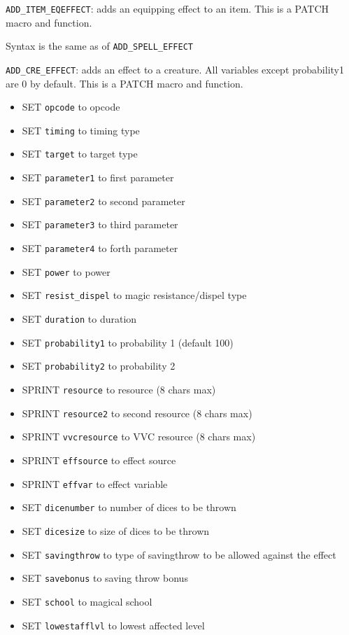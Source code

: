 \documentclass{article}
\begin{document}
\verb+ADD_ITEM_EQEFFECT+: adds an equipping effect to an item.
This is a PATCH macro and function.
\begin{list}{}{}
\item Syntax is the same as of \verb+ADD_SPELL_EFFECT+
\end{list}

\verb+ADD_CRE_EFFECT+: adds an effect to a creature. All variables except probability1 are 0 by default.
This is a PATCH macro and function.
\begin{itemize}
\item SET \verb+opcode+ to opcode
\item SET \verb+timing+ to timing type
\item SET \verb+target+ to target type
\item SET \verb+parameter1+ to first parameter
\item SET \verb+parameter2+ to second parameter
\item SET \verb+parameter3+ to third parameter
\item SET \verb+parameter4+ to forth parameter
\item SET \verb+power+ to power
\item SET \verb+resist_dispel+ to magic resistance/dispel type
\item SET \verb+duration+ to duration
\item SET \verb+probability1+ to probability 1 (default 100)
\item SET \verb+probability2+ to probability 2
\item SPRINT \verb+resource+ to resource (8 chars max)
\item SPRINT \verb+resource2+ to second resource (8 chars max)
\item SPRINT \verb+vvcresource+ to VVC resource (8 chars max)
\item SPRINT \verb+effsource+ to effect source
\item SPRINT \verb+effvar+ to effect variable
\item SET \verb+dicenumber+ to number of dices to be thrown
\item SET \verb+dicesize+ to size of dices to be thrown
\item SET \verb+savingthrow+ to type of savingthrow to be allowed against the effect
\item SET \verb+savebonus+ to saving throw bonus
\item SET \verb+school+ to magical school
\item SET \verb+lowestafflvl+ to lowest affected level

\end{itemize}
\end{document}
